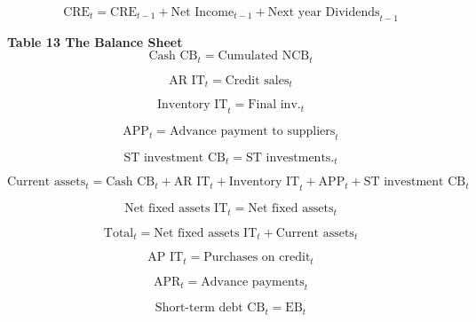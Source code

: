 \documentclass[12pt]{article}
\numberwithin{equation}{section}
\begin{document}
\begin{equation}
	\text{CRE}_{t} = \text{CRE}_{t-1} + \text{Net Income}_{t-1} +  \text{Next year Dividends}_{t-1}
\end{equation}


\textbf{Table 13 The Balance Sheet}
\begin{equation}
	\text{Cash CB}_{t} = \text{Cumulated NCB}_{t}
\end{equation}

\begin{equation}
	\text{AR IT}_{t} = \text{Credit sales}_{t}
\end{equation}

\begin{equation}
	\text{Inventory IT}_{t} = \text{Final inv.}_{t}
\end{equation}

\begin{equation}
	\text{APP}_{t} = \text{Advance payment to suppliers}_{t}
\end{equation}

\begin{equation}
	\text{ST investment CB}_{t} = \text{ST investments.}_{t}
\end{equation}

\begin{equation}
	\text{Current assets}_{t} = \text{Cash CB}_{t} + \text{AR IT}_{t} + \text{Inventory IT}_{t} + \text{APP}_{t} + \text{ST investment CB}_{t}
\end{equation}

\begin{equation}
	\text{Net fixed assets IT}_{t} = \text{Net fixed assets}_{t}
\end{equation}

\begin{equation}
	\text{Total}_{t} = \text{Net fixed assets IT}_{t} + \text{Current assets}_{t}
\end{equation}

\begin{equation}
	\text{AP IT}_{t} = \text{Purchases on credit}_{t}
\end{equation}

\begin{equation}
	\text{APR}_{t} = \text{Advance payments}_{t}
\end{equation}

\begin{equation}
	\text{Short-term debt CB}_{t} = \text{EB}_{t}
\end{equation}
\end{document}
